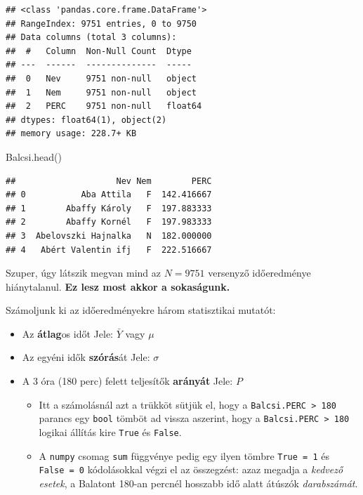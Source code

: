 \documentclass[
]{book}
\newenvironment{Shaded}{\begin{snugshade}}{\end{snugshade}}
\newcommand{\NormalTok}[1]{#1}
\providecommand{\tightlist}{%
  \setlength{\itemsep}{0pt}\setlength{\parskip}{0pt}}
\begin{document}
\begin{verbatim}
## <class 'pandas.core.frame.DataFrame'>
## RangeIndex: 9751 entries, 0 to 9750
## Data columns (total 3 columns):
##  #   Column  Non-Null Count  Dtype  
## ---  ------  --------------  -----  
##  0   Nev     9751 non-null   object 
##  1   Nem     9751 non-null   object 
##  2   PERC    9751 non-null   float64
## dtypes: float64(1), object(2)
## memory usage: 228.7+ KB
\end{verbatim}

\begin{Shaded}
\begin{Highlighting}[]
\NormalTok{Balcsi.head()}
\end{Highlighting}
\end{Shaded}

\begin{verbatim}
##                    Nev Nem        PERC
## 0           Aba Attila   F  142.416667
## 1        Abaffy Károly   F  197.883333
## 2        Abaffy Kornél   F  197.983333
## 3  Abelovszki Hajnalka   N  182.000000
## 4   Abért Valentin ifj   F  222.516667
\end{verbatim}

Szuper, úgy látszik megvan mind az \(N=9751\) versenyző időeredménye hiánytalanul. \textbf{Ez lesz most akkor a sokaságunk.}

Számoljunk ki az időeredményekre három statisztikai mutatót:

\begin{itemize}
\tightlist
\item
  Az \textbf{átlag}os időt Jele: \(\bar{Y}\) vagy \(\mu\)
\item
  Az egyéni idők \textbf{szórás}át Jele: \(\sigma\)
\item
  A 3 óra (180 perc) felett teljesítők \textbf{arányát} Jele: \(P\)

  \begin{itemize}
  \tightlist
  \item
    Itt a számolásnál azt a trükköt sütjük el, hogy a \texttt{Balcsi.PERC\ \textgreater{}\ 180} parancs egy \texttt{bool} tömböt ad vissza aszerint, hogy a \texttt{Balcsi.PERC\ \textgreater{}\ 180} logikai állítás kire \texttt{True} és \texttt{False}.
  \item
    A \texttt{numpy} csomag \texttt{sum} függvénye pedig egy ilyen tömbre \texttt{True\ =\ 1} és \texttt{False\ =\ 0} kódolásokkal végzi el az összegzést: azaz megadja a \emph{kedvező esetek}, a Balatont 180-an percnél hosszabb idő alatt átúszók \emph{darabszámát}.
  \end{itemize}
\end{itemize}
\end{document}
